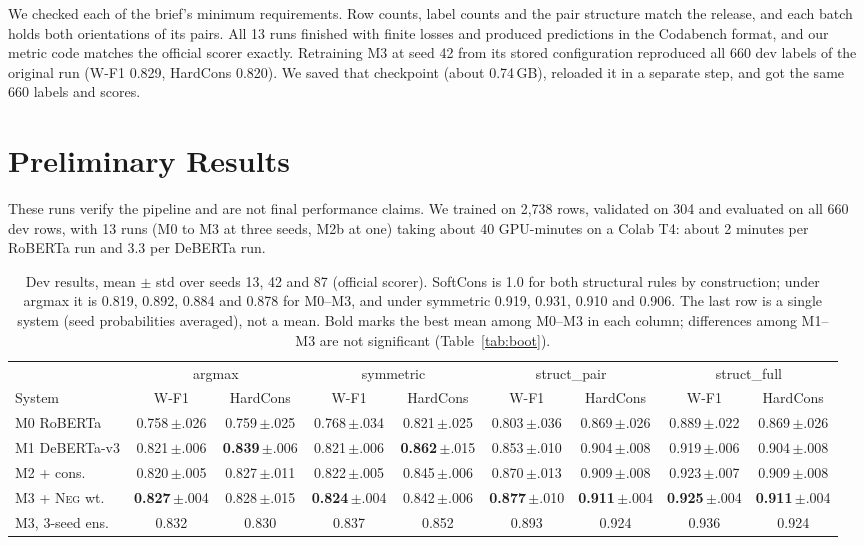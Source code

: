 \documentclass[10pt,a4paper,twocolumn]{article}
\newcommand{\Neg}{\textsc{Neg}}
\newcommand{\sd}[1]{\,{\scriptsize$\pm$#1}}
\begin{document}
We checked each of the brief's minimum requirements. Row counts, label counts and the pair structure match the release, and each batch holds both orientations of its pairs. All 13 runs finished with finite losses and produced predictions in the Codabench format, and our metric code matches the official scorer exactly. Retraining M3 at seed 42 from its stored configuration reproduced all 660 dev labels of the original run (W-F1 0.829, HardCons 0.820). We saved that checkpoint (about 0.74\,GB), reloaded it in a separate step, and got the same 660 labels and scores.

\section{Preliminary Results}
\label{sec:results}

These runs verify the pipeline and are not final performance claims. We trained on 2,738 rows, validated on 304 and evaluated on all 660 dev rows, with 13 runs (M0 to M3 at three seeds, M2b at one) taking about 40 GPU-minutes on a Colab T4: about 2 minutes per RoBERTa run and 3.3 per DeBERTa run.

\begin{table}[!t]
\centering
\footnotesize
\setlength{\tabcolsep}{2.6pt}
\begin{tabular}{l cc cc cc cc}
\toprule
& \multicolumn{2}{c}{argmax} & \multicolumn{2}{c}{symmetric} & \multicolumn{2}{c}{struct\_pair} & \multicolumn{2}{c}{struct\_full} \\
\cmidrule(lr){2-3}\cmidrule(lr){4-5}\cmidrule(lr){6-7}\cmidrule(lr){8-9}
System & W-F1 & HardCons & W-F1 & HardCons & W-F1 & HardCons & W-F1 & HardCons \\
\midrule
M0 RoBERTa & 0.758\sd{.026} & 0.759\sd{.025} & 0.768\sd{.034} & 0.821\sd{.025} & 0.803\sd{.036} & 0.869\sd{.026} & 0.889\sd{.022} & 0.869\sd{.026} \\
M1 DeBERTa-v3 & 0.821\sd{.006} & \textbf{0.839}\sd{.006} & 0.821\sd{.006} & \textbf{0.862}\sd{.015} & 0.853\sd{.010} & 0.904\sd{.008} & 0.919\sd{.006} & 0.904\sd{.008} \\
M2 + cons. & 0.820\sd{.005} & 0.827\sd{.011} & 0.822\sd{.005} & 0.845\sd{.006} & 0.870\sd{.013} & 0.909\sd{.008} & 0.923\sd{.007} & 0.909\sd{.008} \\
M3 + \Neg{} wt. & \textbf{0.827}\sd{.004} & 0.828\sd{.015} & \textbf{0.824}\sd{.004} & 0.842\sd{.006} & \textbf{0.877}\sd{.010} & \textbf{0.911}\sd{.004} & \textbf{0.925}\sd{.004} & \textbf{0.911}\sd{.004} \\
\midrule
M3, 3-seed ens. & 0.832 & 0.830 & 0.837 & 0.852 & 0.893 & 0.924 & 0.936 & 0.924 \\
\bottomrule
\end{tabular}
\caption{Dev results, mean $\pm$ std over seeds 13, 42 and 87 (official scorer). SoftCons is 1.0 for both structural rules by construction; under argmax it is 0.819, 0.892, 0.884 and 0.878 for M0--M3, and under symmetric 0.919, 0.931, 0.910 and 0.906. The last row is a single system (seed probabilities averaged), not a mean. Bold marks the best mean among M0--M3 in each column; differences among M1--M3 are not significant (Table~\ref{tab:boot}).}
\label{tab:main}
\end{table}
\end{document}
